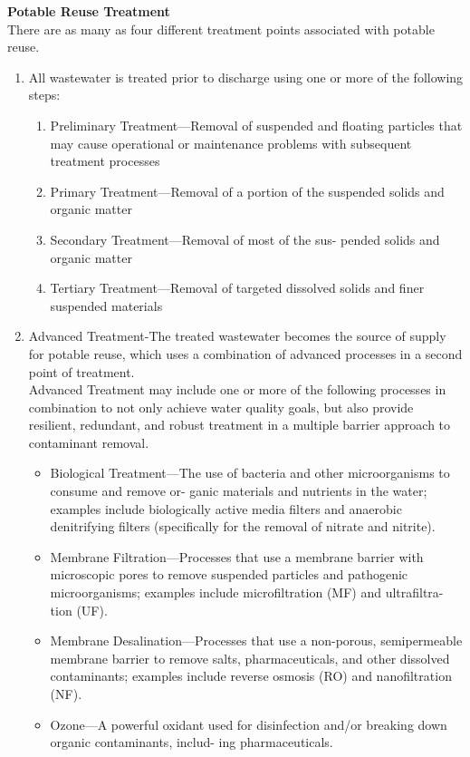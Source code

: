 \documentclass{article}
\begin{document}
\textbf{Potable Reuse Treatment}\\
There are as many as four different treatment points associated with potable reuse.\\
\begin{enumerate}
\item All wastewater is treated prior to discharge using one or more of the following steps:
\begin{enumerate}
\item Preliminary Treatment—Removal of suspended and floating particles that may cause operational or maintenance problems with subsequent treatment processes
\item Primary Treatment—Removal of a portion of the suspended solids and organic matter
\item Secondary Treatment—Removal of most of the sus- pended solids and organic matter
\item Tertiary Treatment—Removal of targeted dissolved solids and finer suspended materials
\end{enumerate}
\item Advanced Treatment-The treated wastewater becomes the source of supply for potable reuse, which uses a combination of advanced processes in a second point of treatment.\\ 
Advanced Treatment may include one or more of the following processes in combination to not only achieve water quality goals, but also provide resilient, redundant, and robust treatment in a multiple barrier approach to contaminant removal.
\begin{itemize}
\item Biological Treatment—The use of bacteria and other microorganisms to consume and remove or- ganic materials and nutrients in the water; examples include biologically active media filters and anaerobic denitrifying filters (specifically for the removal of nitrate and nitrite).
\item Membrane Filtration—Processes that use a membrane barrier with microscopic pores to remove suspended particles and pathogenic microorganisms; examples include microfiltration (MF) and ultrafiltra- tion (UF).
\item Membrane Desalination—Processes that use a non-porous, semipermeable membrane barrier to remove salts, pharmaceuticals, and other dissolved contaminants; examples include reverse osmosis (RO) and nanofiltration (NF).
\item Ozone—A powerful oxidant used for disinfection and/or breaking down organic contaminants, includ- ing pharmaceuticals.

\end{itemize}
\end{enumerate}
\end{document}
